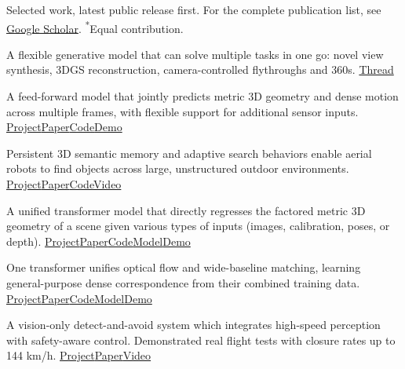 {\small Selected work, latest public release first. For the complete publication list, see \href{https://scholar.google.com/citations?user=ZTm5H50AAAAJ\&hl=en}{Google Scholar}. \textsuperscript{*}Equal contribution.\par}

  {A flexible generative model that can solve multiple tasks in one go: novel view synthesis, 3DGS reconstruction, camera-controlled flythroughs and 360s.}
  {\href{https://x.com/Nik__V__/status/2061929833584533801}{Thread}}

  {A feed-forward model that jointly predicts metric 3D geometry and dense motion across multiple frames, with flexible support for additional sensor inputs.}
  {\href{https://any-4d.github.io/}{Project}\linksep \href{https://arxiv.org/abs/2512.10935}{Paper}\linksep \href{https://github.com/Any-4D/Any4D}{Code}\linksep \href{https://huggingface.co/spaces/theairlabcmu/Any4D}{Demo}}

  {Persistent 3D semantic memory and adaptive search behaviors enable aerial robots to find objects across large, unstructured outdoor environments.}
  {\href{https://raven-semantic.github.io/}{Project}\linksep \href{https://arxiv.org/abs/2509.23563}{Paper}\linksep \href{https://github.com/castacks/RAVEN}{Code}\linksep \href{https://youtu.be/slLuZv3-zIs}{Video}}

  {A unified transformer model that directly regresses the factored metric 3D geometry of a scene given various types of inputs (images, calibration, poses, or depth).}
  {\href{https://map-anything.github.io/}{Project}\linksep \href{https://arxiv.org/abs/2509.13414}{Paper}\linksep \href{https://github.com/facebookresearch/map-anything}{Code}\linksep \href{https://huggingface.co/facebook/map-anything}{Model}\linksep \href{https://huggingface.co/spaces/facebook/map-anything}{Demo}}

  {One transformer unifies optical flow and wide-baseline matching, learning general-purpose dense correspondence from their combined training data.}
  {\href{https://uniflowmatch.github.io/}{Project}\linksep \href{https://arxiv.org/abs/2506.09278}{Paper}\linksep \href{https://github.com/UniFlowMatch/UFM}{Code}\linksep \href{https://huggingface.co/infinity1096/UFM-Base}{Model}\linksep \href{https://huggingface.co/spaces/infinity1096/UFM}{Demo}}

  {A vision-only detect-and-avoid system which integrates high-speed perception with safety-aware control. Demonstrated real flight tests with closure rates up to 144 km/h.}
  {\href{https://theairlab.org/visafe/}{Project}\linksep \href{https://arxiv.org/abs/2505.03694}{Paper}\linksep \href{https://youtu.be/oQxh6X9sDtw}{Video}}

